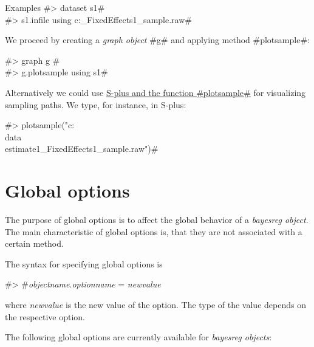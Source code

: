 \begin{stanza}{Examples}
#> dataset s1# \\
#> s1.infile using c:\data{}_FixedEffects1_sample.raw#

We proceed by creating a {\em graph object} #g# and applying
method #plotsample#:

#> graph g #\\
#> g.plotsample using s1#

Alternatively we could use \hyperref[splusplotsample]{S-plus and the
function #plotsample#} for visualizing sampling paths. We type, for
instance, in S-plus:

#> plotsample("c:\\data\\estimate1_FixedEffects1_sample.raw")#

\end{stanza}

\section{Global options}
\label{bayesregglobopt} 

The purpose of global options is to affect the global behavior of
a {\em bayesreg object}. The main characteristic of global options
is, that they are not associated with a certain method.

The syntax for specifying global options is

#> #{\em objectname}.{\em optionname} = {\em newvalue}

where {\em newvalue} is the new value of the option. The type of
the value depends on the respective option.

The following global options are currently available for {\em
bayesreg objects}:

